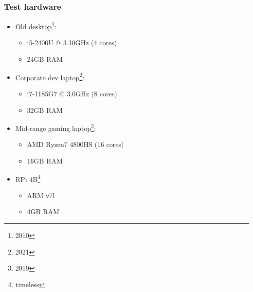\documentclass[compress,table,xcolor=table]{beamer}
\begin{document}
\begin{frame}
  \frametitle{Test hardware}
  \larger
  \begin{itemize}
  \item Old desktop\footnote{2010}:
    \begin{itemize}
    \smaller
    \item i5-2400U @ 3.10GHz (4 cores)
    \item 24GB RAM
    \end{itemize}
  \item Corporate dev laptop\footnote{2021}:
    \begin{itemize}
    \smaller
    \item i7-1185G7 @ 3.0GHz (8 cores)
    \item 32GB RAM
    \end{itemize}
  \item Mid-range gaming laptop\footnote{2019}:
    \begin{itemize}
    \smaller
    \item AMD Ryzen7 4800HS (16 cores)
    \item 16GB RAM
    \end{itemize}
  \item RPi 4B\footnote{timeless}
    \begin{itemize}
    \smaller
    \item ARM v7l
    \item 4GB RAM
    \end{itemize}
  \end{itemize}
\end{frame}
\end{document}
